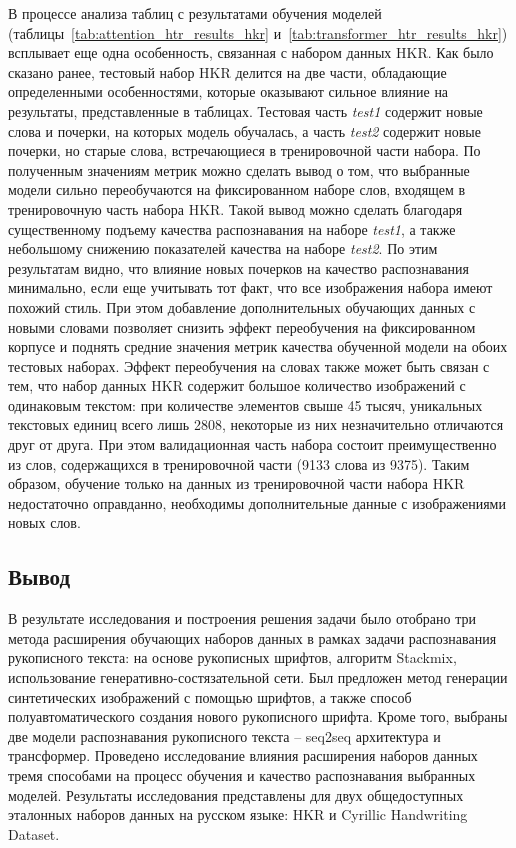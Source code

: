 В процессе анализа таблиц с результатами обучения моделей (таблицы~\ref{tab:attention_htr_results_hkr} и~\ref{tab:transformer_htr_results_hkr}) всплывает еще одна особенность, связанная с набором данных HKR.
Как было сказано ранее, тестовый набор HKR делится на две части, обладающие определенными особенностями,
которые оказывают сильное влияние на результаты, представленные в таблицах.
Тестовая часть \textit{test1} содержит новые слова и почерки, на которых модель обучалась, а часть \textit{test2}
содержит новые почерки, но старые слова, встречающиеся в тренировочной части набора.
По полученным значениям метрик можно сделать вывод о том, что выбранные модели сильно переобучаются на фиксированном наборе слов,
входящем в тренировочную часть набора HKR.
Такой вывод можно сделать благодаря существенному подъему качества распознавания на наборе \textit{test1},
а также небольшому снижению показателей качества на наборе \textit{test2}.
По этим результатам видно, что влияние новых почерков на качество распознавания минимально, если еще учитывать тот факт, что все изображения набора имеют похожий стиль.
При этом добавление дополнительных обучающих данных с новыми словами позволяет снизить эффект переобучения на фиксированном корпусе и
поднять средние значения метрик качества обученной модели на обоих тестовых наборах.
Эффект переобучения на словах также может быть связан с тем, что набор данных HKR содержит большое количество изображений с одинаковым текстом:
при количестве элементов свыше 45 тысяч, уникальных текстовых единиц всего лишь 2808, некоторые из них незначительно отличаются друг от друга.
При этом валидационная часть набора состоит преимущественно из слов, содержащихся в тренировочной части (9133 слова из 9375).
Таким образом, обучение только на данных из тренировочной части набора HKR недостаточно оправданно, необходимы дополнительные данные с изображениями новых слов.


\subsection{Вывод}
\label{subsec:experiment_conclusion}

В результате исследования и построения решения задачи было отобрано три метода расширения обучающих наборов данных
в рамках задачи распознавания рукописного текста: на основе рукописных шрифтов, алгоритм Stackmix, использование
генеративно-состязательной сети.
Был предложен метод генерации синтетических изображений с помощью шрифтов, а также способ полуавтоматического
создания нового рукописного шрифта.
Кроме того, выбраны две модели распознавания рукописного текста -- seq2seq архитектура и трансформер.
Проведено исследование влияния расширения наборов данных тремя способами на процесс обучения и качество распознавания выбранных моделей.
Результаты исследования представлены для двух общедоступных эталонных наборов данных на русском языке: HKR и Cyrillic Handwriting Dataset.

